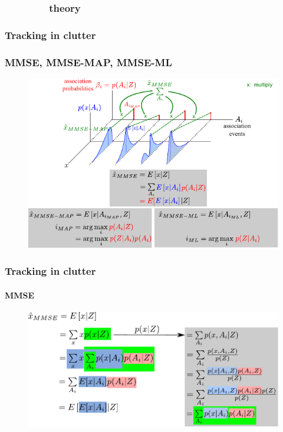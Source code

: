 \subsubsection{\ \ \ \ \ \ \ \ theory}
\begin{frame}
\frametitle{Tracking in clutter}
\frametitle{MMSE, MMSE-MAP, MMSE-ML}
\logoCSIPCPL\mypagenum
	\begin{figure}
		\includegraphics[width=1.0\textwidth]{figs/TRK_clutter_all.pdf}
	\end{figure}
\end{frame}



\begin{frame}
\frametitle{Tracking in clutter}
\framesubtitle{MMSE}
\logoCSIPCPL\mypagenum
	\begin{figure}
		\includegraphics[width=1.0\textwidth]{figs/TRK_clutter_MMSE.pdf}
	\end{figure}
\end{frame}


